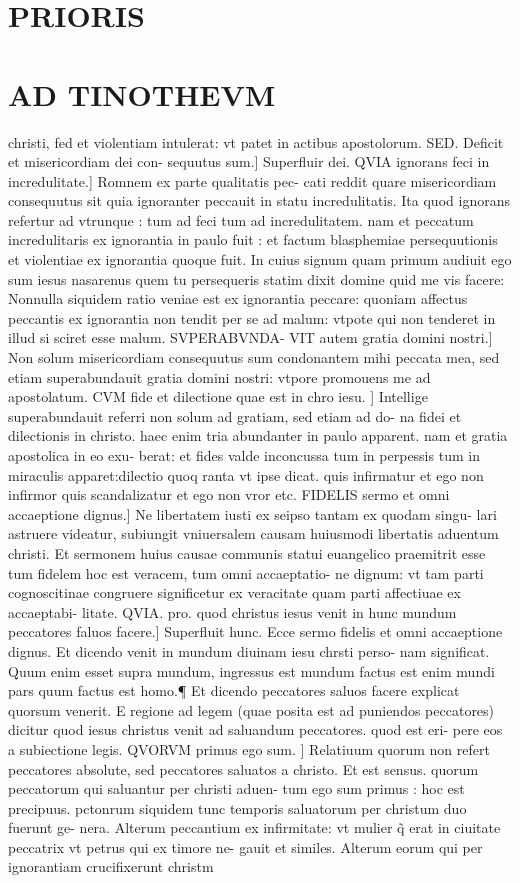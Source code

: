 \documentclass{article}
\begin{document}
\begin{pages}
\section*{PRIORIS }
\section*{AD TINOTHEVM }\pstart christi, fed et violentiam intulerat: vt patet in actibus apostolorum. SED. Deficit et misericordiam dei con- sequutus sum.] Superfluir dei. QVIA ignorans feci in incredulitate.] Romnem ex parte qualitatis pec- cati reddit quare misericordiam consequutus sit quia ignoranter peccauit in statu incredulitatis. Ita quod ignorans refertur ad vtrunque : tum ad feci tum ad incredulitatem. nam et peccatum incredulitaris ex ignorantia in paulo fuit : et factum blasphemiae persequutionis et violentiae ex ignorantia quoque fuit. In cuius signum quam primum audiuit ego sum iesus nasarenus quem tu persequeris statim dixit domine quid me vis facere: Nonnulla siquidem ratio veniae est ex ignorantia peccare: quoniam affectus peccantis ex ignorantia  non tendit per se ad malum: vtpote qui non tenderet in illud si sciret esse malum. SVPERABVNDA- VIT autem gratia domini nostri.] Non solum misericordiam consequutus sum condonantem mihi peccata mea, sed etiam superabundauit gratia domini nostri: vtpore promouens me ad apostolatum. CVM fide et dilectione quae est in chro iesu. ] Intellige superabundauit referri non solum ad gratiam, sed etiam ad do- na fidei et dilectionis in christo. haec enim tria abundanter in paulo apparent. nam et gratia apostolica in eo exu- berat: et fides valde inconcussa tum in perpessis tum in miraculis apparet:dilectio quoq ranta vt ipse dicat. quis infirmatur et ego non infirmor quis scandalizatur et ego non vror etc.   \pend\pstart FIDELIS sermo et omni accaeptione dignus.] Ne libertatem iusti ex seipso tantam ex quodam singu- lari astruere videatur, subiungit vniuersalem causam huiusmodi libertatis aduentum christi. Et sermonem huius causae communis statui euangelico praemitrit esse tum fidelem hoc est veracem, tum omni accaeptatio- ne dignum: vt tam parti cognoscitinae congruere significetur ex veracitate quam parti affectiuae ex accaeptabi- litate. QVIA. pro. quod christus iesus venit in hunc mundum peccatores faluos facere.] Superfluit hunc. Ecce sermo fidelis et omni accaeptione dignus. Et dicendo venit in mundum diuinam iesu chrsti perso- nam significat. Quum enim esset supra mundum, ingressus est mundum factus est enim mundi pars quum factus est homo.¶ Et dicendo peccatores saluos facere explicat quorsum venerit. E regione ad legem (quae posita est ad puniendos peccatores) dicitur quod iesus christus venit ad saluandum peccatores. quod est eri- pere eos a subiectione legis. QVORVM primus ego sum. ] Relatiuum quorum non refert peccatores absolute, sed peccatores saluatos a christo. Et est sensus. quorum peccatorum qui saluantur per christi aduen- tum ego sum primus : hoc est precipuus. pctonrum siquidem tunc temporis saluatorum per christum duo fuerunt ge- nera. Alterum peccantium ex infirmitate: vt mulier q̃ erat in ciuitate peccatrix vt petrus qui ex timore ne- gauit et similes. Alterum eorum qui per ignorantiam crucifixerunt christm 
\end{pages}
\end{document}
